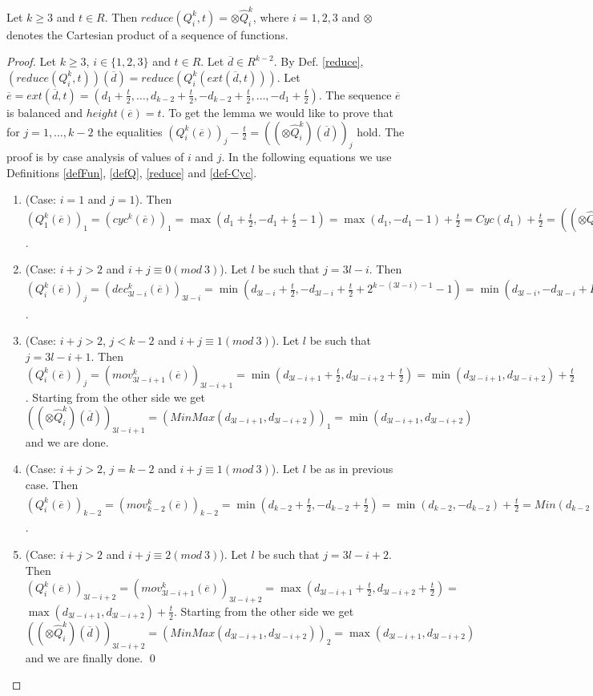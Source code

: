 \documentclass{llncs}
\begin{document}
\begin{lemma}\label{l5}
Let $k\ge 3$ and $t\in R$. Then $reduce(Q^k_i,t) = \otimes \hat{Q}^k_i$, where
$i=1,2,3$ and $\otimes$ denotes the Cartesian product of a sequence of
functions.
\end{lemma}
\begin{proof}
Let $k\ge 3$, $i\in\{1,2,3\}$ and $t\in R$. Let $\overline{d}\in R^{k-2}$. By 
Def. \ref{reduce}, $(reduce(Q^k_i,t))(\overline{d}) = 
reduce(Q^k_i(ext(\overline{d},t)))$. Let $\overline{e} = ext(\overline{d},t) 
= (d_1+\frac{t}{2}, \ldots, d_{k-2}+\frac{t}{2}, -d_{k-2}+\frac{t}{2},\ldots, 
-d_1+\frac{t}{2})$. The sequence $\overline{e}$ is balanced and 
$height(\overline{e}) = t$. To get the lemma we would like to prove that for 
$j = 1, \ldots, k-2$ the equalities $(Q^k_i(\overline{e}))_j - \frac{t}{2} = 
((\otimes \hat{Q}^k_i)(\overline{d}))_j$ hold. The proof is by case analysis 
of 
values of $i$ and $j$. In the following equations we use Definitions 
\ref{defFun}, \ref{defQ}, \ref{reduce} and \ref{def-Cyc}.
\begin{enumerate}
\item (Case: $i=1$ and $j = 1$). Then $(Q^k_1(\overline{e}))_1 = 
(cyc^k(\overline{e}))_1 = \max(d_1+\frac{t}{2},-d_1+\frac{t}{2}-1) = 
\max(d_1,-d_1-1)+\frac{t}{2} = Cyc(d_1)+\frac{t}{2} = ((\otimes 
\hat{Q}^k_i)(\overline{d}))_1+\frac{t}{2}$.
\item (Case: $i+j > 2$ and $i+j\equiv 0 (mod~3)$). Let $l$ be such that $j = 
3l - i$. Then $(Q^k_i(\overline{e}))_j = (dec^k_{3l-i}(\overline{e}))_{3l-i} 
= \min(d_{3l-i}+\frac{t}{2},-d_{3l-i}+\frac{t}{2} + 2^{k-(3l-i)-1}-1) = 
\min(d_{3l-i},-d_{3l-i} + H_{k-(3l-i)-1}) + \frac{t}{2} = 
Dec_{k-3l+i-1}(d_{3l-i}) + \frac{t}{2} = ((\otimes 
\hat{Q}^k_i)(\overline{d}))_j + \frac{t}{2}$.
\item (Case: $i+j > 2$, $j<k-2$ and $i+j\equiv 1 (mod~3)$). Let $l$ be such 
that $j = 3l-i+1$. Then $(Q^k_i(\overline{e}))_j = 
(mov^k_{3l-i+1}(\overline{e}))_{3l-i+1} = 
\min(d_{3l-i+1}+\frac{t}{2},d_{3l-i+2}+\frac{t}{2}) = 
\min(d_{3l-i+1},d_{3l-i+2})+\frac{t}{2}$. Starting from the other side we get
$((\otimes \hat{Q}^k_i)(\overline{d}))_{3l-i+1} = (MinMax(d_{3l-i+1}, 
d_{3l-i+2}))_1 = \min(d_{3l-i+1},d_{3l-i+2})$ and we are done.
\item (Case: $i+j > 2$, $j=k-2$ and $i+j\equiv 1 (mod~3)$). Let $l$ be as in 
previous case. Then $(Q^k_i(\overline{e}))_{k-2} = 
(mov^k_{k-2}(\overline{e}))_{k-2} = 
\min(d_{k-2}+\frac{t}{2},-d_{k-2}+\frac{t}{2}) = \min(d_{k-2},-d_{k-2}) + 
\frac{t}{2} = Min(d_{k-2})+\frac{t}{2} = ((\otimes 
\hat{Q}^k_i)(\overline{d}))_{k-2} + \frac{t}{2}$.
\item (Case: $i+j > 2$ and $i+j\equiv 2 (mod~3)$). Let $l$ be such 
that $j = 3l-i+2$. Then $(Q^k_i(\overline{e}))_{3l-i+2} = 
(mov^k_{3l-i+1}(\overline{e}))_{3l-i+2} = 
\max(d_{3l-i+1}+\frac{t}{2}, d_{3l-i+2}+\frac{t}{2}) =$ \\ $\max(d_{3l-i+1}, 
d_{3l-i+2})+\frac{t}{2}$. Starting from the other side we get
$((\otimes \hat{Q}^k_i)(\overline{d}))_{3l-i+2} = (MinMax(d_{3l-i+1}, 
d_{3l-i+2}))_2 = \max(d_{3l-i+1},d_{3l-i+2})$ and we are finally done. \qed
\end{enumerate}
\end{proof}
\end{document}
